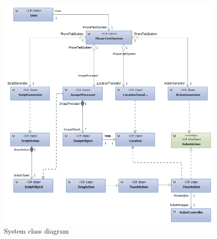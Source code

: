     \begin{figure}[H]
		\centering
		\includegraphics[scale=0.75]{Chapters/Fig/class_diagram.png}
		\caption{System class diagram}
		\label{fig:class_diagram}
	\end{figure}

